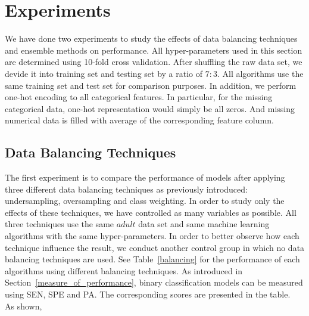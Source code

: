 \documentclass{article}
\begin{document}
\section{Experiments}
\label{experiments}

We have done two experiments to study the effects of data balancing techniques and ensemble methods on performance. All hyper-parameters used in this section are determined using 10-fold cross validation. After shuffling the raw data set, we devide it into training set and testing set by a ratio of $7:3$. All algorithms use the same training set and test set for comparison purposes. In addition, we perform one-hot encoding to all categorical features. In particular, for the missing categorical data, one-hot representation would simply be all zeros. And missing numerical data is filled with average of the corresponding feature column.

\subsection{Data Balancing Techniques}
\label{balancing_experiment}

The first experiment is to compare the performance of models after applying three different data balancing techniques as previously introduced: undersampling, oversampling and class weighting. In order to study only the effects of these techniques, we have controlled as many variables as possible. All three techniques use the same $adult$ data set and same machine learning algorithms with the same hyper-parameters. In order to better observe how each technique influence the result, we conduct another control group in which no data balancing techniques are used. See Table~\ref{balancing} for the performance of each algorithms using different balancing techniques. As introduced in Section~\ref{measure_of_performance}, binary classification models can be measured using SEN, SPE and PA. The corresponding scores are presented in the table.\\

As shown,
\end{document}
